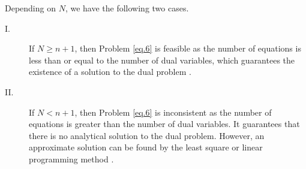 \begin{remark} 
	Depending on $N$, we have the following two cases.
	\begin{description}
		\item[I.] If $N \geq n+1$, then Problem \ref{eq.6} is feasible as the number of equations is less than or equal to the number of dual variables, which guarantees the existence of a solution to the dual problem \cite{Beightler 1976}.
		\item[II.] If $N < n+1$, then Problem \ref{eq.6} is inconsistent as the number of equations is greater than the number of dual variables. It guarantees that there is no analytical solution to the dual problem. However, an approximate solution can be found by the least square or linear programming method \cite{sinha 1987}.
	\end{description}
\end{remark}
